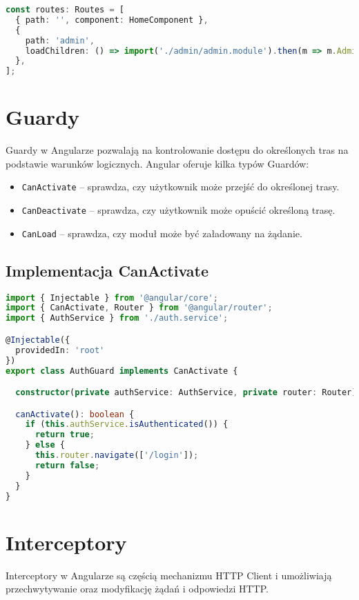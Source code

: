 \documentclass[a4paper,12pt]{article}
\begin{document}
\begin{lstlisting}[language=TypeScript, caption=Przykład Lazy Loading w Angularze]
const routes: Routes = [
  { path: '', component: HomeComponent },
  { 
    path: 'admin', 
    loadChildren: () => import('./admin/admin.module').then(m => m.AdminModule) 
  },
];
\end{lstlisting}

\section{Guardy}
Guardy w Angularze pozwalają na kontrolowanie dostępu do określonych tras na podstawie warunków logicznych. Angular oferuje kilka typów Guardów:

\begin{itemize}
    \item \texttt{CanActivate} – sprawdza, czy użytkownik może przejść do określonej trasy.
    \item \texttt{CanDeactivate} – sprawdza, czy użytkownik może opuścić określoną trasę.
    \item \texttt{CanLoad} – sprawdza, czy moduł może być załadowany na żądanie.
\end{itemize}

\subsection{Implementacja CanActivate}
\begin{lstlisting}[language=TypeScript, caption=Przykład implementacji \texttt{CanActivate}]
import { Injectable } from '@angular/core';
import { CanActivate, Router } from '@angular/router';
import { AuthService } from './auth.service';

@Injectable({
  providedIn: 'root'
})
export class AuthGuard implements CanActivate {

  constructor(private authService: AuthService, private router: Router) {}

  canActivate(): boolean {
    if (this.authService.isAuthenticated()) {
      return true;
    } else {
      this.router.navigate(['/login']);
      return false;
    }
  }
}
\end{lstlisting}

\section{Interceptory}
Interceptory w Angularze są częścią mechanizmu HTTP Client i umożliwiają przechwytywanie oraz modyfikację żądań i odpowiedzi HTTP.
\end{document}

